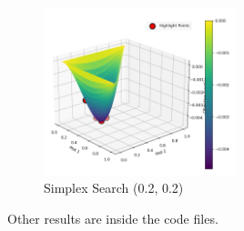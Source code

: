 \documentclass{article}
\begin{document}
        \begin{figure}[H]
            \centering
            \includegraphics[width=0.5\textwidth]{steepest-02.png}
            \caption{Simplex Search (0.2, 0.2)}
        \end{figure}
        Other results are inside the code files.

    
\end{document}
